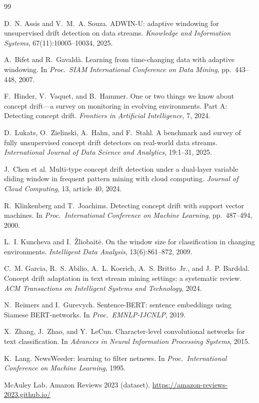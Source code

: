 \documentclass[11pt,a4paper]{article}
\begin{document}
\begin{thebibliography}{99}\small

 D.~N. Assis and V.~M.~A. Souza. ADWIN-U: adaptive windowing for unsupervised drift detection on data streams. \emph{Knowledge and Information Systems}, 67(11):10005--10034, 2025.

 A.~Bifet and R.~Gavald\`a. Learning from time-changing data with adaptive windowing. In \emph{Proc.\ SIAM International Conference on Data Mining}, pp.\ 443--448, 2007.

 F.~Hinder, V.~Vaquet, and B.~Hammer. One or two things we know about concept drift---a survey on monitoring in evolving environments. Part A: Detecting concept drift. \emph{Frontiers in Artificial Intelligence}, 7, 2024.

 D.~Lukats, O.~Zielinski, A.~Hahn, and F.~Stahl. A benchmark and survey of fully unsupervised concept drift detectors on real-world data streams. \emph{International Journal of Data Science and Analytics}, 19:1--31, 2025.

 J.~Chen et al. Multi-type concept drift detection under a dual-layer variable sliding window in frequent pattern mining with cloud computing. \emph{Journal of Cloud Computing}, 13, article 40, 2024.

 R.~Klinkenberg and T.~Joachims. Detecting concept drift with support vector machines. In \emph{Proc.\ International Conference on Machine Learning}, pp.\ 487--494, 2000.

 L.~I. Kuncheva and I.~\v{Z}liobait\.{e}. On the window size for classification in changing environments. \emph{Intelligent Data Analysis}, 13(6):861--872, 2009.

 C.~M. Garcia, R.~S. Abilio, A.~L. Koerich, A.~S. Britto~Jr., and J.~P. Barddal. Concept drift adaptation in text stream mining settings: a systematic review. \emph{ACM Transactions on Intelligent Systems and Technology}, 2024.

 N.~Reimers and I.~Gurevych. Sentence-BERT: sentence embeddings using Siamese BERT-networks. In \emph{Proc.\ EMNLP-IJCNLP}, 2019.

 X.~Zhang, J.~Zhao, and Y.~LeCun. Character-level convolutional networks for text classification. In \emph{Advances in Neural Information Processing Systems}, 2015.

 K.~Lang. NewsWeeder: learning to filter netnews. In \emph{Proc.\ International Conference on Machine Learning}, 1995.

 McAuley Lab. Amazon Reviews 2023 (dataset). \url{https://amazon-reviews-2023.github.io/}

\end{thebibliography}
\end{document}
